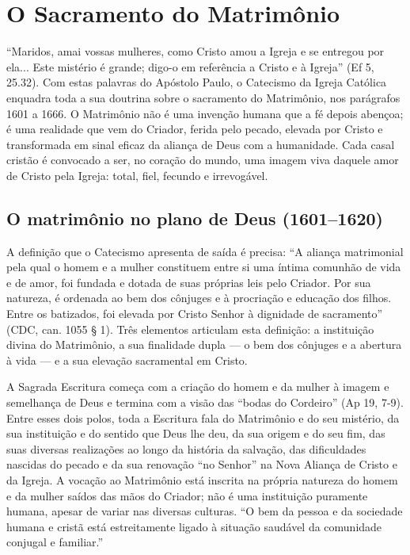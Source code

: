 \chapter{O Sacramento do Matrimônio}

``Maridos, amai vossas mulheres, como Cristo amou a Igreja e se entregou por ela... Este mistério é grande; digo-o em referência a Cristo e à Igreja'' (Ef 5, 25.32). Com estas palavras do Apóstolo Paulo, o Catecismo da Igreja Católica enquadra toda a sua doutrina sobre o sacramento do Matrimônio, nos parágrafos 1601 a 1666. O Matrimônio não é uma invenção humana que a fé depois abençoa; é uma realidade que vem do Criador, ferida pelo pecado, elevada por Cristo e transformada em sinal eficaz da aliança de Deus com a humanidade. Cada casal cristão é convocado a ser, no coração do mundo, uma imagem viva daquele amor de Cristo pela Igreja: total, fiel, fecundo e irrevogável.

\section{O matrimônio no plano de Deus (1601--1620)}

A definição que o Catecismo apresenta de saída é precisa: ``A aliança matrimonial pela qual o homem e a mulher constituem entre si uma íntima comunhão de vida e de amor, foi fundada e dotada de suas próprias leis pelo Criador. Por sua natureza, é ordenada ao bem dos cônjuges e à procriação e educação dos filhos. Entre os batizados, foi elevada por Cristo Senhor à dignidade de sacramento'' (CDC, can. 1055 § 1). Três elementos articulam esta definição: a instituição divina do Matrimônio, a sua finalidade dupla --- o bem dos cônjuges e a abertura à vida --- e a sua elevação sacramental em Cristo.

A Sagrada Escritura começa com a criação do homem e da mulher à imagem e semelhança de Deus e termina com a visão das ``bodas do Cordeiro'' (Ap 19, 7-9). Entre esses dois polos, toda a Escritura fala do Matrimônio e do seu mistério, da sua instituição e do sentido que Deus lhe deu, da sua origem e do seu fim, das suas diversas realizações ao longo da história da salvação, das dificuldades nascidas do pecado e da sua renovação ``no Senhor'' na Nova Aliança de Cristo e da Igreja. A vocação ao Matrimônio está inscrita na própria natureza do homem e da mulher saídos das mãos do Criador; não é uma instituição puramente humana, apesar de variar nas diversas culturas. ``O bem da pessoa e da sociedade humana e cristã está estreitamente ligado à situação saudável da comunidade conjugal e familiar.''


